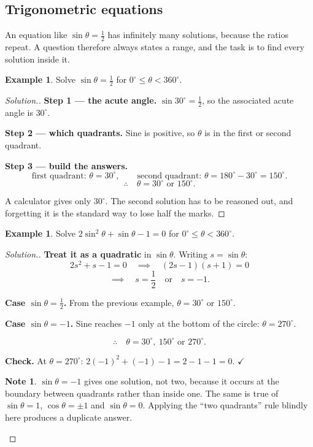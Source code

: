 \documentclass[11pt,a4paper]{article}
\theoremstyle{definition}
\newtheorem{example}[thm]{Example}
\newtheorem{note}[thm]{Note}
\newenvironment{solution}
  {\renewcommand{\qedsymbol}{}\begin{proof}[\textit{Solution}.]}
  {\end{proof}}
\let\amscheckmark\checkmark
\renewcommand{\checkmark}{\ensuremath{\amscheckmark}}
\begin{document}
\subsection{Trigonometric equations}

An equation like $\sin\theta=\frac{1}{2}$ has infinitely many solutions, because the
ratios repeat. A question therefore always states a range, and the task is to find
every solution inside it.

\begin{example}
Solve $\sin\theta=\frac{1}{2}$ for $0^\circ\leq\theta<360^\circ$.
\end{example}

\begin{solution}
\textbf{Step 1 --- the acute angle.} $\sin 30^\circ=\frac{1}{2}$, so the associated
acute angle is $30^\circ$.

\textbf{Step 2 --- which quadrants.} Sine is positive, so $\theta$ is in the first or
second quadrant.

\textbf{Step 3 --- build the answers.}
$$\text{first quadrant: } \theta=30^\circ,\qquad
\text{second quadrant: } \theta=180^\circ-30^\circ=150^\circ.$$
$$\therefore\quad \theta=30^\circ \text{ or } 150^\circ.$$

A calculator gives only $30^\circ$. The second solution has to be reasoned out, and
forgetting it is the standard way to lose half the marks.
\end{solution}

\begin{example}
Solve $2\sin^2\theta+\sin\theta-1=0$ for $0^\circ\leq\theta<360^\circ$.
\end{example}

\begin{solution}
\textbf{Treat it as a quadratic} in $\sin\theta$. Writing $s=\sin\theta$:
$$2s^2+s-1=0\quad\implies\quad (2s-1)(s+1)=0$$
$$\implies\quad s=\frac{1}{2}\quad\text{or}\quad s=-1.$$

\textbf{Case $\sin\theta=\frac{1}{2}$.} From the previous example,
$\theta=30^\circ$ or $150^\circ$.

\textbf{Case $\sin\theta=-1$.} Sine reaches $-1$ only at the bottom of the circle:
$\theta=270^\circ$.

$$\therefore\quad \theta=30^\circ,\ 150^\circ \text{ or } 270^\circ.$$

\textbf{Check.} At $\theta=270^\circ$: $2(-1)^2+(-1)-1=2-1-1=0$. \checkmark

\begin{note}
$\sin\theta=-1$ gives one solution, not two, because it occurs at the boundary between
quadrants rather than inside one. The same is true of $\sin\theta=1$,
$\cos\theta=\pm 1$ and $\sin\theta=0$. Applying the ``two quadrants'' rule blindly
here produces a duplicate answer.
\end{note}
\end{solution}
\end{document}
